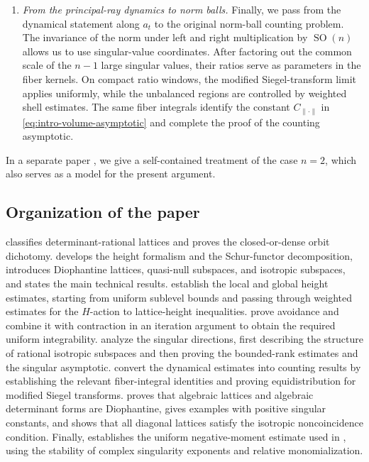 \documentclass[reqno,11pt]{amsart}
\numberwithin{equation}{section}
\theoremstyle{definition}
\theoremstyle{remark}
\newcommand{\op}{\operatorname}
\newcommand{\SO}{\op{SO}}
\begin{document}
\begin{enumerate}[label=\textnormal{(\arabic*)}]
\item \emph{From the principal-ray dynamics to norm balls.}
Finally, we pass from the dynamical statement along $a_t$ to the original
norm-ball counting problem. The invariance of the norm under left and right
multiplication by $\SO(n)$ allows us to use singular-value coordinates.
After factoring out the common scale of the $n-1$ large singular
values, their ratios serve as parameters in the fiber kernels. On compact ratio windows, the
modified Siegel-transform limit applies uniformly, while the unbalanced
regions are controlled by weighted shell estimates. The same fiber
integrals identify the constant $C_{\|\cdot\|}$ in
\eqref{eq:intro-volume-asymptotic} and complete the proof of the counting
asymptotic.

\end{enumerate}




In a separate paper \cite{KimOh_two}, we give a self-contained treatment of the case $n=2$, which also serves as a model for the present argument.

\subsection*{Organization of the paper}

 classifies determinant-rational lattices and proves
the closed-or-dense orbit dichotomy.  develops the height
formalism and the Schur-functor decomposition, introduces  Diophantine lattices,
quasi-null subspaces, and isotropic subspaces, and states the main technical results.  establish the local and global height estimates, starting from uniform sublevel bounds and passing through weighted estimates for the $H$-action to lattice-height inequalities.  prove avoidance and combine it with contraction in an iteration argument to obtain the required uniform integrability.  analyze the singular directions, first describing
the structure of rational isotropic subspaces and then proving the bounded-rank
estimates and the singular asymptotic. 
convert the dynamical estimates into counting results by establishing the relevant
fiber-integral identities and proving equidistribution for modified Siegel
transforms.  proves that algebraic lattices and algebraic
determinant forms are Diophantine, gives examples with  positive
singular constants, and shows that all diagonal lattices satisfy the
isotropic noncoincidence condition.
Finally,  establishes the uniform negative-moment estimate used in , using the stability of complex singularity exponents and relative monomialization.
\end{document}

